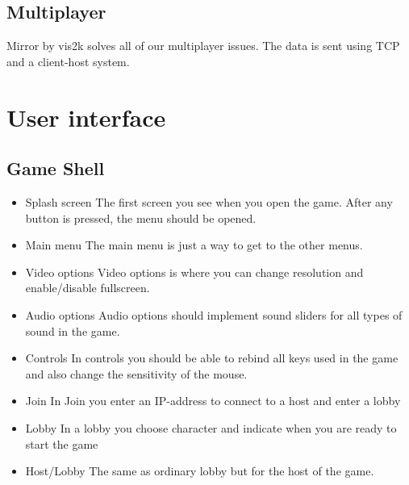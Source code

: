\documentclass[11pt]{article}
\begin{document}
\subsection{Multiplayer}
Mirror by vis2k solves all of our multiplayer issues. The data is sent using TCP and a client-host system.

\section{User interface}
\subsection{Game Shell}
\begin{itemize}
\item Splash screen
\newline The first screen you see when you open the game. After any button is pressed, the menu should be opened.
\item Main menu
\newline The main menu is just a way to get to the other menus.
\item Video options
\newline Video options is where you can change resolution and enable/disable fullscreen.
\item Audio options
\newline Audio options should implement sound sliders for all types of sound in the game.
\item Controls
\newline In controls you should be able to rebind all keys used in the game and also change the sensitivity of the mouse.
\item Join
\newline In Join you enter an IP-address to connect to a host and enter a lobby
\item Lobby
\newline In a lobby you choose character and indicate when you are ready to start the game
\item Host/Lobby
\newline The same as ordinary lobby but for the host of the game.
\end{itemize}
\end{document}
